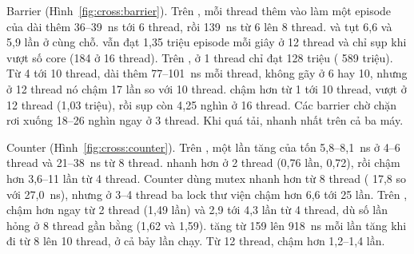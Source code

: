 
Barrier (Hình~\ref{fig:cross:barrier}). Trên , mỗi thread thêm vào làm một episode của
 dài thêm 36--39~ns tới 6 thread, rồi 139~ns từ 6 lên 8 thread.  và
 tụt 6,6 và 5,9 lần ở cùng chỗ.  vẫn đạt 1,35 triệu episode mỗi giây ở 12
thread và chỉ sụp khi vượt số core (184 ở 16 thread). Trên ,  ở 1 thread chỉ
đạt 128 triệu ( 589 triệu). Từ 4 tới 10 thread,  dài thêm 77--101~ns mỗi
thread, không gãy ở 6 hay 10, nhưng ở 12 thread nó chậm 17 lần so với 10 thread. 
chậm hơn  từ 1 tới 10 thread, vượt  ở 12 thread (1,03 triệu), rồi sụp còn 4,25
nghìn ở 16 thread. Các barrier chờ chặn rơi xuống 18--26 nghìn ngay ở 3 thread. Khi quá tải,
 nhanh nhất trên cả ba máy.


Counter (Hình~\ref{fig:cross:counter}). Trên , một lần tăng của  tốn
5,8--8,1~ns ở 4--6 thread và 21--38~ns từ 8 thread.  nhanh hơn  ở 2 thread (0,76
lần,  0,72), rồi chậm hơn 3,6--11 lần từ 4 thread. Counter dùng mutex nhanh hơn
 từ 8 thread ( 17,8 so với 27,0~ns), nhưng ở 3--4 thread ba lock thư
viện chậm hơn  6,6 tới 25 lần. Trên ,  chậm hơn  ngay
từ 2 thread (1,49 lần) và 2,9 tới 4,3 lần từ 4 thread, dù số lần hỏng ở 8 thread gần bằng
 (1,62 và 1,59).  tăng từ 159 lên 918~ns mỗi lần tăng khi đi từ 8 lên
10 thread, ở cả bảy lần chạy. Từ 12 thread,  chậm hơn  1,2--1,4
lần.

